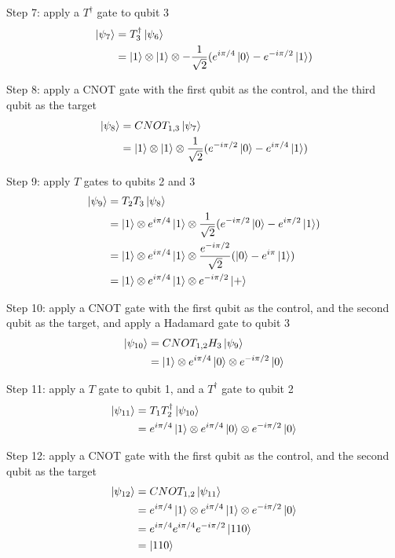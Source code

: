 Step 7: apply a $T^\dag$ gate to qubit 3
\begin{align*}
	\ket{\psi_{7}} &= T_{3}^\dag \ket{\psi_{6}} \\
	&= \ket{1} \otimes \ket{1} \otimes -\frac{1}{\sqrt{2}}(e^{i\pi/4}\ket{0} - e^{-i\pi/2}\ket{1})
\end{align*}

Step 8: apply a CNOT gate with the first qubit as the control, and the third qubit as the target
\begin{align*}
	\ket{\psi_{8}} &= CNOT_{1,3} \ket{\psi_{7}} \\
	&= \ket{1} \otimes \ket{1} \otimes \frac{1}{\sqrt{2}}(e^{-i\pi/2}\ket{0} - e^{i\pi/4}\ket{1})
\end{align*}

Step 9: apply $T$ gates to qubits 2 and 3
\begin{align*}
	\ket{\psi_{9}} &= T_2 T_3 \ket{\psi_{8}} \\
	&= \ket{1} \otimes e^{i\pi/4}\ket{1} \otimes \frac{1}{\sqrt{2}}(e^{-i\pi/2}\ket{0} - e^{i\pi/2}\ket{1}) \\
	&= \ket{1} \otimes e^{i\pi/4}\ket{1} \otimes \frac{e^{-i\pi/2}}{\sqrt{2}}(\ket{0} - e^{i\pi}\ket{1})\\
	&= \ket{1} \otimes e^{i\pi/4}\ket{1} \otimes e^{-i\pi/2}\ket{+}
\end{align*}

Step 10: apply a CNOT gate with the first qubit as the control, and the second qubit as the target, and apply a Hadamard gate to qubit 3
\begin{align*}
	\ket{\psi_{10}} &= CNOT_{1,2} H_3 \ket{\psi_{9}} \\
	&= \ket{1} \otimes e^{i\pi/4}\ket{0} \otimes e^{-i\pi/2}\ket{0}
\end{align*}

Step 11: apply a $T$ gate to qubit 1, and a $T^\dag$ gate to qubit 2
\begin{align*}
	\ket{\psi_{11}} &= T_1 T^\dag_2 \ket{\psi_{10}} \\
	& = e^{i\pi/4}\ket{1} \otimes e^{i\pi/4}\ket{0} \otimes e^{-i\pi/2}\ket{0}
\end{align*}

Step 12: apply a CNOT gate with the first qubit as the control, and the second qubit as the target
\begin{align*}
	\ket{\psi_{12}} &= CNOT_{1,2} \ket{\psi_{11}} \\
	&= e^{i\pi/4}\ket{1} \otimes e^{i\pi/4}\ket{1} \otimes e^{-i\pi/2}\ket{0}\\
	&= e^{i\pi/4}e^{i\pi/4}e^{-i\pi/2}\ket{110} \\
	&= \ket{110} 
\end{align*}


